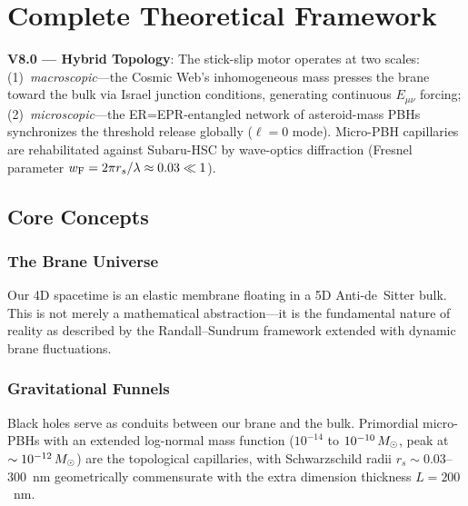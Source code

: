 
\chapter{Complete Theoretical Framework}
\label{ch:framework}

\textbf{V8.0 --- Hybrid Topology}: The stick-slip motor operates at two scales: (1)~\emph{macroscopic}---the Cosmic Web's inhomogeneous mass presses the brane toward the bulk via Israel junction conditions, generating continuous $E_{\mu\nu}$ forcing; (2)~\emph{microscopic}---the ER=EPR-entangled network of asteroid-mass PBHs synchronizes the threshold release globally ($\ell=0$ mode). Micro-PBH capillaries are rehabilitated against Subaru-HSC by wave-optics diffraction (Fresnel parameter $w_\text{F} = 2\pi r_s/\lambda \approx 0.03 \ll 1$).

\section{Core Concepts}
\label{sec:core_concepts}

\subsection{The Brane Universe}

Our 4D spacetime is an elastic membrane floating in a 5D Anti-de~Sitter bulk. This is not merely a mathematical abstraction---it is the fundamental nature of reality as described by the Randall--Sundrum framework extended with dynamic brane fluctuations.

\subsection{Gravitational Funnels}

Black holes serve as conduits between our brane and the bulk. Primordial micro-PBHs with an extended log-normal mass function ($10^{-14}$ to $10^{-10}\,M_\odot$, peak at $\sim 10^{-12}\,M_\odot$) are the topological capillaries, with Schwarzschild radii $r_s \sim 0.03$--$300$~nm geometrically commensurate with the extra dimension thickness $L = 200$~nm.

